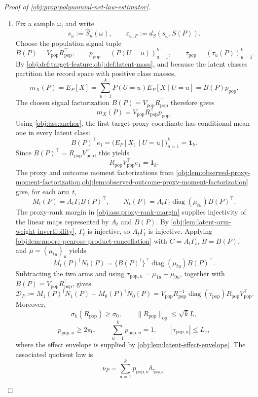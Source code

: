 \documentclass[11pt]{article}
\begin{document}
\begin{proof}[Proof of \cref{obj:prop:polynomial-net-law-estimator}]
\begin{enumerate}
\item Fix a sample \(\omega\), and write
\[
s_\omega:=\widehat S_n(\omega),
\qquad
\varepsilon_{\omega,P}:=d_S(s_\omega,S(P)).
\]
Choose the population signal tuple
\[
B(P)=V_{\mathrm{pop}}R_{\mathrm{pop}}^\top,\qquad
p_{\mathrm{pop}}=(P(U=u))_{u=1}^k,\qquad
\tau_{\mathrm{pop}}=(\tau_u(P))_{u=1}^k .
\]
By \cref{obj:def:target-feature,obj:def:latent-mass}, and because the latent classes partition the record space with positive class masses,
\[
m_X(P)
=E_P[X]
=\sum_{u=1}^k P(U=u)E_P[X\mid U=u]
=B(P)p_{\mathrm{pop}}.
\]
The chosen signal factorization \(B(P)=V_{\mathrm{pop}}R_{\mathrm{pop}}^\top\) therefore gives
\[
m_X(P)=V_{\mathrm{pop}}R_{\mathrm{pop}}^\top p_{\mathrm{pop}}.
\]
Using \cref{obj:ass:anchor}, the first target-proxy coordinate has conditional mean one in every latent class:
\[
B(P)^\top e_1
=
\bigl(E_P[X_1\mid U=u]\bigr)_{u=1}^k
=\mathbf1_k.
\]
Since \(B(P)^\top=R_{\mathrm{pop}}V_{\mathrm{pop}}^\top\), this yields
\[
R_{\mathrm{pop}}V_{\mathrm{pop}}^\top e_1=\mathbf1_k.
\]
The proxy and outcome moment factorizations from
\cref{obj:lem:observed-proxy-moment-factorization,obj:lem:observed-outcome-proxy-moment-factorization} give, for each arm \(t\),
\[
M_t(P)=A_t\Gamma_tB(P)^\top,
\qquad
N_t(P)=A_t\Gamma_t\operatorname{diag}(\mu_{tu})B(P)^\top .
\]
The proxy-rank margin in \cref{obj:ass:proxy-rank-margin} supplies injectivity of the linear maps represented by \(A_t\) and \(B(P)\).  By \cref{obj:lem:latent-arm-weight-invertibility}, \(\Gamma_t\) is injective, so \(A_t\Gamma_t\) is injective.  Applying \cref{obj:lem:moore-penrose-product-cancellation} with \(C=A_t\Gamma_t\), \(B=B(P)\), and \(\mu=(\mu_{tu})_u\) yields
\[
M_t(P)^\dagger N_t(P)
=
\{B(P)^\dagger\}^\top\operatorname{diag}(\mu_{tu})B(P)^\top .
\]
Subtracting the two arms and using \(\tau_{\mathrm{pop},u}=\mu_{1u}-\mu_{0u}\), together with \(B(P)=V_{\mathrm{pop}}R_{\mathrm{pop}}^\top\), gives
\[
\mathcal D_P:=
M_1(P)^\dagger N_1(P)-M_0(P)^\dagger N_0(P)
=
V_{\mathrm{pop}}R_{\mathrm{pop}}^{-1}
\operatorname{diag}(\tau_{\mathrm{pop}})
R_{\mathrm{pop}}V_{\mathrm{pop}}^\top .
\]
Moreover,
\[
\sigma_k(R_{\mathrm{pop}})\ge\sigma_0,\qquad
\|R_{\mathrm{pop}}\|_{\mathrm{op}}\le\sqrt{k}L,
\]
\[
p_{\mathrm{pop},u}\ge2\pi_0,\qquad
\sum_{u=1}^k p_{\mathrm{pop},u}=1,\qquad
|\tau_{\mathrm{pop},u}|\le L_\tau ,
\]
where the effect envelope is supplied by \cref{obj:lem:latent-effect-envelope}.  The associated quotient law is
\[
\nu_P=\sum_{u=1}^k p_{\mathrm{pop},u}\delta_{\tau_{\mathrm{pop},u}} .
\] %


\end{enumerate}
\end{proof}
\end{document}
